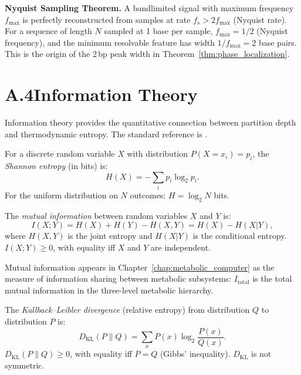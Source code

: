 \medskip\noindent\textbf{Nyquist Sampling Theorem.}
A bandlimited signal with maximum frequency $f_{\max}$ is perfectly
reconstructed from samples at rate $f_s > 2 f_{\max}$ (Nyquist rate). For
a sequence of length $N$ sampled at 1 base per sample, $f_{\max} = 1/2$
(Nyquist frequency), and the minimum resolvable feature has width $1/f_{\max} = 2$
base pairs. This is the origin of the 2\,bp peak width in Theorem~\ref{thm:phase_localization}.

\section*{A.4\quad Information Theory}
\label{app:information_theory}

Information theory provides the quantitative connection between partition
depth and thermodynamic entropy. The standard reference is \citet{cover2006elements}.

\begin{definition}
For a discrete random variable $X$ with distribution $P(X = x_i) = p_i$, the
\emph{Shannon entropy} (in bits) is:
\begin{equation}
  H(X) = -\sum_i p_i \log_2 p_i.
  \label{eq:shannon_entropy}
\end{equation}
For the uniform distribution on $N$ outcomes: $H = \log_2 N$ bits.
\end{definition}

\begin{definition}
The \emph{mutual information} between random variables $X$ and $Y$ is:
\begin{equation}
  I(X; Y) = H(X) + H(Y) - H(X, Y) = H(X) - H(X|Y),
  \label{eq:mutual_information}
\end{equation}
where $H(X,Y)$ is the joint entropy and $H(X|Y)$ is the conditional entropy.
$I(X;Y) \geq 0$, with equality iff $X$ and $Y$ are independent.
\end{definition}

Mutual information appears in Chapter~\ref{chap:metabolic_computer} as the
measure of information sharing between metabolic subsystems:
$I_{\mathrm{total}}$ is the total mutual information in the three-level
metabolic hierarchy.

\begin{definition}[KL Divergence]
The \emph{Kullback--Leibler divergence} (relative entropy) from distribution
$Q$ to distribution $P$ is:
\begin{equation}
  D_{\mathrm{KL}}(P \| Q) = \sum_x P(x) \log_2 \frac{P(x)}{Q(x)}.
  \label{eq:kl_divergence}
\end{equation}
$D_{\mathrm{KL}}(P\|Q) \geq 0$, with equality iff $P = Q$ (Gibbs' inequality).
$D_{\mathrm{KL}}$ is not symmetric.
\end{definition}

